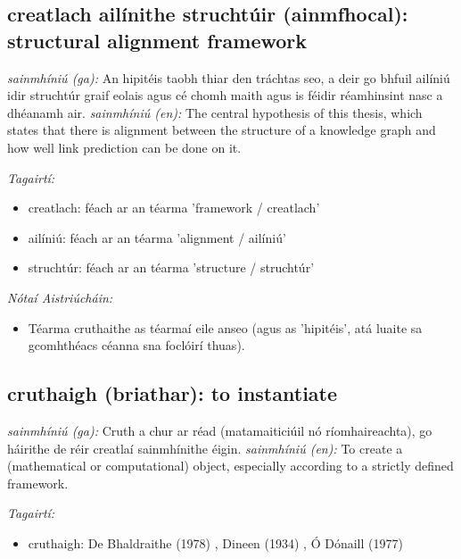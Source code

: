 \documentclass{article}
\begin{document}
\subsection*{creatlach ailínithe struchtúir (ainmfhocal): structural alignment framework} 
 \noindent \textit{sainmhíniú (ga):} An hipitéis taobh thiar den tráchtas seo, a deir go bhfuil ailíniú idir struchtúr graif eolais agus cé chomh maith agus is féidir réamhinsint nasc a dhéanamh air.
\newline\newline
 \noindent \textit{sainmhíniú (en):} The central hypothesis of this thesis, which states that there is alignment between the structure of a knowledge graph and how well link prediction can be done on it.
\newline

 \noindent \textit{Tagairtí:}
\begin{itemize}
	\item creatlach: féach ar an téarma 'framework / creatlach'
	\item ailíniú: féach ar an téarma 'alignment / ailíniú'
	\item struchtúr: féach ar an téarma 'structure / struchtúr'
\end{itemize}

 \noindent \textit{Nótaí Aistriúcháin:}
\begin{itemize}
	\item Téarma cruthaithe as téarmaí eile anseo (agus as 'hipitéis', atá luaite sa gcomhthéacs céanna sna foclóirí thuas).
\end{itemize}


\subsection*{cruthaigh (briathar): to instantiate} 
 \noindent \textit{sainmhíniú (ga):} Cruth a chur ar réad (matamaiticiúil nó ríomhaireachta), go háirithe de réir creatlaí sainmhínithe éigin.
\newline\newline
 \noindent \textit{sainmhíniú (en):} To create a (mathematical or computational) object, especially according to a strictly defined framework.
\newline

 \noindent \textit{Tagairtí:}
\begin{itemize}
	\item cruthaigh: De Bhaldraithe (1978) \cite{de-bhaldraithe}, Dineen (1934) \cite{dineen}, Ó Dónaill (1977) \cite{odonaill}
\end{itemize}
\end{document}
